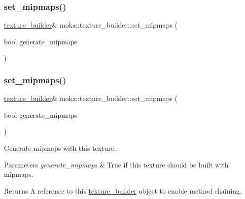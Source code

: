 \subsubsection{\texorpdfstring{set\_mipmaps()}{set\_mipmaps()}\hspace{0.1cm}{\footnotesize\ttfamily [1/2]}}
{\footnotesize\ttfamily \mbox{\hyperlink{classmoka_1_1texture__builder}{texture\+\_\+builder}}\& moka\+::texture\+\_\+builder\+::set\+\_\+mipmaps (\begin{DoxyParamCaption}\item[{bool}]{generate\+\_\+mipmaps }\end{DoxyParamCaption})}

\mbox{\label{classmoka_1_1texture__builder_a5dd6e175a28e9dd958c08103e48e30d6}} 
\subsubsection{\texorpdfstring{set\_mipmaps()}{set\_mipmaps()}\hspace{0.1cm}{\footnotesize\ttfamily [2/2]}}
{\footnotesize\ttfamily \mbox{\hyperlink{classmoka_1_1texture__builder}{texture\+\_\+builder}}\& moka\+::texture\+\_\+builder\+::set\+\_\+mipmaps (\begin{DoxyParamCaption}\item[{bool}]{generate\+\_\+mipmaps }\end{DoxyParamCaption})}



Generate mipmaps with this texture. 


\begin{DoxyParams}{Parameters}
{\em generate\+\_\+mipmaps} & True if this texture should be built with mipmaps. \\
\hline
\end{DoxyParams}
\begin{DoxyReturn}{Returns}
A reference to this \mbox{\hyperlink{classmoka_1_1texture__builder}{texture\+\_\+builder}} object to enable method chaining. 
\end{DoxyReturn}
\mbox{\label{classmoka_1_1texture__builder_ac4ce6bf2b9e2d92867a8134f235016df}} 
